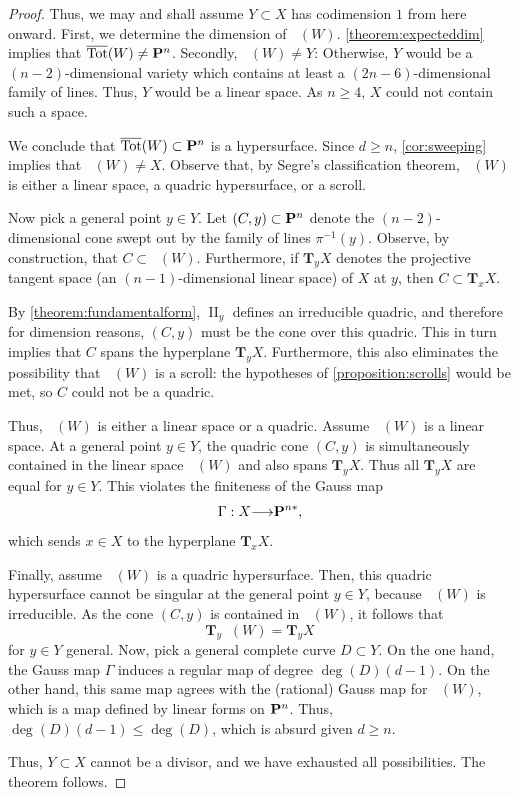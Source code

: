 \documentclass[12pt,reqno]{amsart}
\theoremstyle{plain}
\theoremstyle{remark}
\numberwithin{equation}{section}
\DeclareMathOperator{\II}{II}
\DeclareMathOperator{\Tot}{Tot}
\DeclareMathOperator{\oTot}{\overline{\Tot}}
\renewcommand{\to}{{\longrightarrow}}
\renewcommand {\P}{{\bf P}}
\numberwithin{equation}{section}
\newcommand{\T}{\mathbf T}
\begin{document}
\begin{proof}
Thus, we may and shall assume $Y \subset X$ has codimension $1$ from
here onward.  First, we determine the dimension of
$\oTot(W)$. \autoref{theorem:expecteddim} implies that
$\oTot(W) \neq \P^{n}$.  Secondly, $\oTot(W) \neq Y$: Otherwise, $Y$
would be a $(n-2)$-dimensional variety which contains at least a
$(2n-6)$-dimensional family of lines. Thus, $Y$ would be a linear
space.  As $n \geq 4$, $X$ could not contain such a space.

We conclude that $\oTot(W) \subset \P^{n}$ is a hypersurface.  Since
$d \geq n$, \autoref{cor:sweeping} implies that $\oTot(W) \neq X$.
Observe that, by Segre's classification theorem, $\oTot(W)$ is either
a linear space, a quadric hypersurface, or a scroll.

Now pick a general point $y \in Y$.  Let $(C,y) \subset \P^{n}$ denote
the $(n-2)$-dimensional cone swept out by the family of lines
$\pi^{-1}(y)$.  Observe, by construction, that $C \subset \oTot(W)$.
Furthermore, if $\T_{y}X$ denotes the projective tangent space (an
$(n-1)$-dimensional linear space) of $X$ at $y$, then
$C \subset \T_{x}X$.

By \autoref{theorem:fundamentalform}, $\II_{y}$ defines an irreducible
quadric, and therefore for dimension reasons, $(C,y)$ must be the cone
over this quadric.  This in turn implies that $C$ spans the hyperplane
$\T_{y}X$.  Furthermore, this also eliminates the possibility that
$\oTot(W)$ is a scroll: the hypotheses of
\autoref{proposition:scrolls} would be met, so $C$ could not be a quadric.

Thus, $\oTot(W)$ is either a linear space or a quadric. Assume
$\oTot(W)$ is a linear space.  At a general point $y \in Y$, the
quadric cone $(C,y)$ is simultaneously contained in the linear space
$\oTot(W)$ and also spans $\T_{y}X$. Thus all $\T_yX$ are equal for
$y \in Y$.  This violates the finiteness of the Gauss map
\[\Gamma: X \to \P^{n*},\] which sends $x \in X$ to the hyperplane
$\T_{x}X$.

Finally, assume $\oTot(W)$ is a quadric hypersurface. Then, this
quadric hypersurface cannot be singular at the general point
$y \in Y$, because $\oTot(W)$ is irreducible. As the cone $(C,y)$ is contained in $\oTot(W)$, it follows that
\[\T_{y}\oTot(W) = \T_y X\] for $y \in Y$ general. Now, pick a general
complete curve $D \subset Y$. On the one hand, the Gauss map $\Gamma$
induces a regular map of degree $\deg(D)(d-1)$. On the other hand,
this same map agrees with the (rational) Gauss map for $\oTot(W)$,
which is a map defined by linear forms on $\P^{n}$.  Thus,
$\deg(D)(d-1) \leq \deg(D)$, which is absurd given $d \geq n$.

Thus, $Y \subset X$ cannot be a divisor, and we have exhausted all
possibilities. The theorem follows.

\end{proof}
\end{document}
